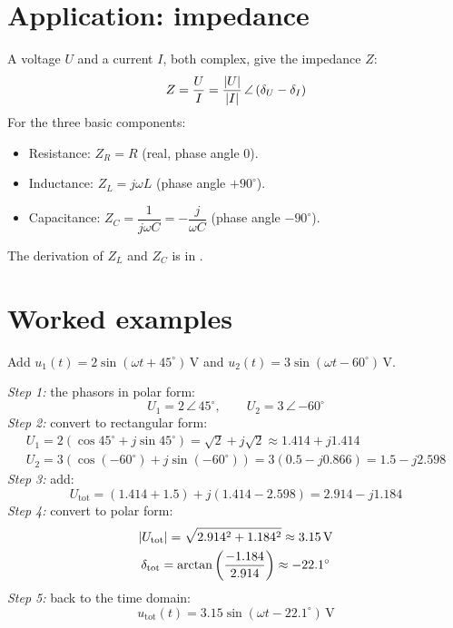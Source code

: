 \section{Application: impedance}
\label{c17:sec:impedans}
A voltage $U$ and a current $I$, both complex, give the impedance $Z$:
\[
  Z = \frac{U}{I} = \frac{\lvert U\rvert}{\lvert I\rvert}\,\angle\,(\delta_U - \delta_I)
\]
For the three basic components:
\begin{itemize}
  \item Resistance: $Z_R = R$ (real, phase angle $0$).
  \item Inductance: $Z_L = j\omega L$ (phase angle $+90^{\circ}$).
  \item Capacitance: $Z_C = \dfrac{1}{j\omega C} = -\dfrac{j}{\omega C}$
    (phase angle $-90^{\circ}$).
\end{itemize}
The derivation of $Z_L$ and $Z_C$ is in .

\section{Worked examples}
\label{c17:sec:typexempel}

\begin{exempel}
Add $u_1(t) = 2\sin(\omega t + 45^{\circ})\,\text{V}$ and
$u_2(t) = 3\sin(\omega t - 60^{\circ})\,\text{V}$.

\noindent\emph{Step 1:} the phasors in polar form:
\[
  U_1 = 2\,\angle\,45^{\circ}, \qquad U_2 = 3\,\angle\,{-60^{\circ}}
\]
\emph{Step 2:} convert to rectangular form:
\begin{gather*}
  U_1 = 2(\cos 45^{\circ} + j\sin 45^{\circ}) = \sqrt{2} + j\sqrt{2} \approx 1.414 + j1.414 \\
  U_2 = 3(\cos(-60^{\circ}) + j\sin(-60^{\circ})) = 3(0.5 - j0.866) = 1.5 - j2.598
\end{gather*}
\emph{Step 3:} add:
\[
  U_{\text{tot}} = (1.414 + 1.5) + j(1.414 - 2.598) = 2.914 - j1.184
\]
\emph{Step 4:} convert to polar form:
\begin{gather*}
  \lvert U_{\text{tot}}\rvert = \sqrt{2.914^2 + 1.184^2} \approx 3.15\,\text{V} \\
  \delta_{\text{tot}} = \arctan\left(\frac{-1.184}{2.914}\right) \approx -22.1^{\circ}
\end{gather*}
\emph{Step 5:} back to the time domain:
\[
  u_{\text{tot}}(t) = 3.15\sin(\omega t - 22.1^{\circ})\,\text{V}
\]
\end{exempel}

